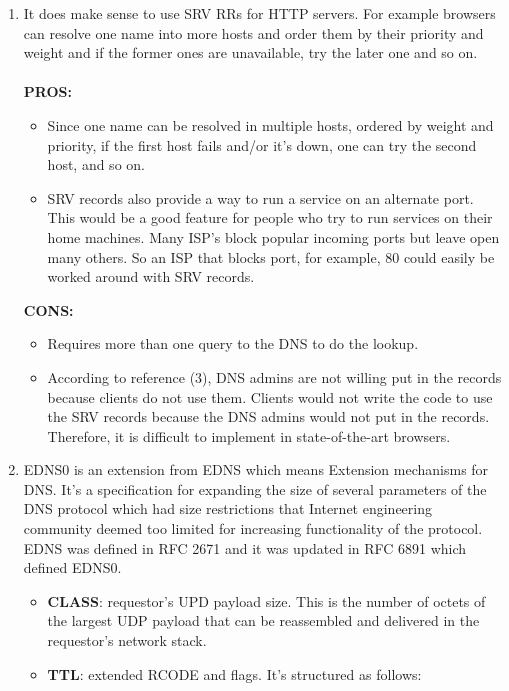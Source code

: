 \documentclass[a4paper]{article}
\begin{document}
\begin{enumerate}[label=(\alph*)]
    \item It does make sense to use SRV RRs for HTTP servers. For example browsers can resolve one name into more hosts and order them by their priority and weight and if the former ones are unavailable, try the later one and so on.\\ \\
    \textbf{PROS:}
    \begin{itemize}
        \item Since one name can be resolved in multiple hosts, ordered by weight and priority, if the first host fails and/or it's down, one can try the second host, and so on.
        \item SRV records also provide a way to run a service on an alternate port. This would be a good feature for people who try to run services on their home machines. Many ISP's block popular incoming ports but leave open many others. So an ISP that blocks port, for example, 80 could easily be worked around with SRV records. 
    \end{itemize}
    \textbf{CONS:}
    \begin{itemize}
        \item Requires more than one query to the DNS to do the lookup. 
        \item According to reference (3), DNS admins are not willing put in the records because clients do not use them. Clients would not write the code to use the SRV records because the DNS admins would not put in the records. Therefore, it is difficult to implement in state-of-the-art browsers.
    \end{itemize}
    \item EDNS0 is an extension from EDNS which means Extension mechanisms for DNS. It's a specification for expanding the size of several parameters of the DNS protocol which had size restrictions that Internet engineering community deemed too limited for increasing functionality of the protocol. EDNS was defined in RFC 2671 and it was updated in RFC 6891 which defined EDNS0.
    \begin{itemize}
        \item \textbf{CLASS}: requestor's UPD payload size. This is the number of octets of the largest UDP payload that can be reassembled and delivered in the requestor's network stack.
        \item \textbf{TTL}: extended RCODE and flags. It's structured as follows:
        \begin{itemize}

\end{itemize}
\end{itemize}
\end{enumerate}
\end{document}
